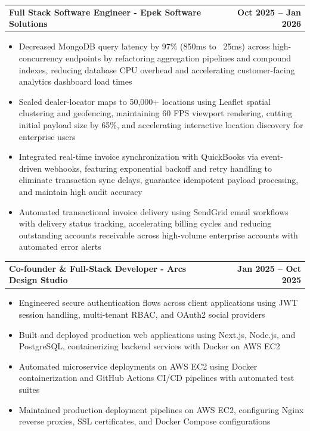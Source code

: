 \documentclass[a4paper,10pt]{article}
\makeatletter
\newcommand{\resumeItemHeader}[2]{%
  \vspace{1pt}%
  \noindent%
  \begin{tabular*}{\textwidth}{@{}l@{\extracolsep{\fill}}r@{}}
    \textbf{\fontsize{9pt}{10.5pt}\selectfont #1} & \textbf{\fontsize{9pt}{10.5pt}\selectfont #2} \\
  \end{tabular*}\par\vspace{0pt}%
}
\makeatother
\begin{document}
\resumeItemHeader{Full Stack Software Engineer - Epek Software Solutions}{Oct 2025 -- Jan 2026}
\begin{itemize}
    \item Decreased MongoDB query latency by 97\% (850ms to ~25ms) across high-concurrency endpoints by refactoring aggregation pipelines and compound indexes, reducing database CPU overhead and accelerating customer-facing analytics dashboard load times
    \item Scaled dealer-locator maps to 50,000+ locations using Leaflet spatial clustering and geofencing, maintaining 60 FPS viewport rendering, cutting initial payload size by 65\%, and accelerating interactive location discovery for enterprise users
    \item Integrated real-time invoice synchronization with QuickBooks via event-driven webhooks, featuring exponential backoff and retry handling to eliminate transaction sync delays, guarantee idempotent payload processing, and maintain high audit accuracy
    \item Automated transactional invoice delivery using SendGrid email workflows with delivery status tracking, accelerating billing cycles and reducing outstanding accounts receivable across high-volume enterprise accounts with automated error alerts
\end{itemize}

\vspace{0.5pt}

\resumeItemHeader{Co-founder \& Full-Stack Developer - Arcs Design Studio}{Jan 2025 -- Oct 2025}
\begin{itemize}
    \item Engineered secure authentication flows across client applications using JWT session handling, multi-tenant RBAC, and OAuth2 social providers
    \item Built and deployed production web applications using Next.js, Node.js, and PostgreSQL, containerizing backend services with Docker on AWS EC2
    \item Automated microservice deployments on AWS EC2 using Docker containerization and GitHub Actions CI/CD pipelines with automated test suites
    \item Maintained production deployment pipelines on AWS EC2, configuring Nginx reverse proxies, SSL certificates, and Docker Compose configurations
\end{itemize}

\vspace{0.5pt}
\end{document}
